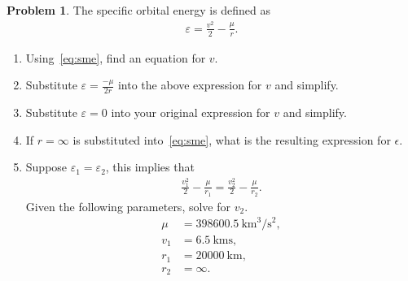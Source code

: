\documentclass[10pt]{article}
\theoremstyle{definition}
\newtheorem{prob}{Problem}[section]
\newenvironment{subprob}%
{\renewcommand{\theenumi}{\alph{enumi}}\renewcommand{\labelenumi}{(\theenumi)}\begin{enumerate}}%
{\end{enumerate}}%
\begin{document}
\begin{prob}
    The specific orbital energy is defined as
    \begin{align}\label{eq:sme}
        \varepsilon = \frac{v^2}{2} - \frac{\mu}{r} .
    \end{align}
    
    \begin{subprob}
        \item Using~\cref{eq:sme}, find an equation for \( v \).
        \item Substitute \( \varepsilon = \frac{-\mu}{2 r} \) into the above expression for \( v \) and simplify.
        \item Substitute \( \varepsilon = 0 \) into your original expression for \( v \) and simplify.
        \item If \( r = \infty \) is substituted into~\cref{eq:sme}, what is the resulting expression for \( \epsilon \).
        \item Suppose \( \varepsilon_1 = \varepsilon_2 \), this implies that
            \begin{align*}
                \frac{v_1^2}{2} - \frac{\mu}{r_1} = \frac{v_2^2}{2} - \frac{\mu}{r_2} .
            \end{align*}
            Given the following parameters, solve for \( v_2 \).
            \begin{align*}
                \mu &= \SI{398600.5}{\kilo\meter\cubed\per\second\squared} , \\
                v_1 &= \SI{6.5}{\kilo\meter\second}, \\
                r_1 &= \SI{20000}{\kilo\meter} , \\
                r_2 &= \infty .
            \end{align*}
    \end{subprob}
\end{prob}
\end{document}
